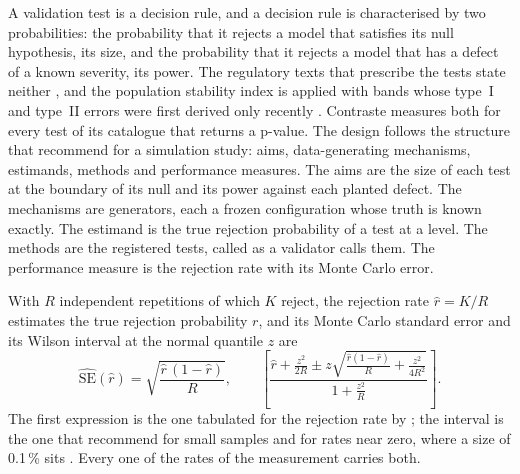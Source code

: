 A validation test is a decision rule, and a decision rule is characterised by two probabilities: the probability that it rejects a
model that satisfies its null hypothesis, its size, and the probability that it rejects a model that has a defect of a known
severity, its power. The regulatory texts that prescribe the tests state neither \citep{credit-scoring:ecb2019,credit-scoring:bcbswp14}, and the
population stability index is applied with bands whose type~I and type~II errors were first derived only recently
\citep{credit-scoring:yurdakul2020}. Contraste measures both for every test of its catalogue that returns a p-value. The design follows the
structure that \citet{alm:morris2019} recommend for a simulation study: aims, data-generating mechanisms, estimands, methods and
performance measures. The aims are the size of each test at the boundary of its null and its power against each planted defect. The
mechanisms are \pxOneGens{} generators, each a frozen configuration whose truth is known exactly. The estimand is the true rejection
probability of a test at a level. The methods are the registered tests, called as a validator calls them. The performance measure is the
rejection rate with its Monte Carlo error.

With $R$ independent repetitions of which $K$ reject, the rejection rate $\hat r=K/R$ estimates the true rejection probability $r$,
and its Monte Carlo standard error and its Wilson interval at the normal quantile $z$ are
\begin{equation}
\widehat{\mathrm{SE}}(\hat r)=\sqrt{\frac{\hat r\,(1-\hat r)}{R}},\qquad
\left[\frac{\hat r+\frac{z^{2}}{2R}\pm z\sqrt{\frac{\hat r(1-\hat r)}{R}+\frac{z^{2}}{4R^{2}}}}{1+\frac{z^{2}}{R}}\right].
\label{eq:bs1-se-wilson}
\end{equation}
The first expression is the one tabulated for the rejection rate by \citet{alm:morris2019}; the interval is the one that
\citet{ratings:brown2001} recommend for small samples and for rates near zero, where a size of 0.1\,\% sits \citep{credit-capital:wilson1927}.
Every one of the \pxOneRates{} rates of the measurement carries both.

